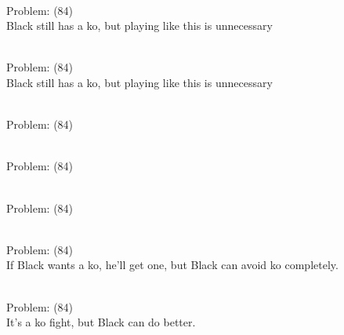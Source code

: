 \documentclass[11pt]{article}
\begin{document}
\begin{minipage}[t]{0.5\textwidth}
  {\centering
  
\\
Problem: (84)\\
Black still has a ko, but playing like this is unnecessary\\
  }
\end{minipage}
\begin{minipage}[t]{0.5\textwidth}
  {\centering
  
\\
Problem: (84)\\
Black still has a ko, but playing like this is unnecessary\\
  }
\end{minipage}
\begin{minipage}[t]{0.5\textwidth}
  {\centering
  
\\
Problem: (84)\\
  }
\end{minipage}
\begin{minipage}[t]{0.5\textwidth}
  {\centering
  
\\
Problem: (84)\\
  }
\end{minipage}
\begin{minipage}[t]{0.5\textwidth}
  {\centering
  
\\
Problem: (84)\\
  }
\end{minipage}
\begin{minipage}[t]{0.5\textwidth}
  {\centering
  
\\
Problem: (84)\\
If Black wants a ko, he'll get one, but Black can avoid ko completely.\\
  }
\end{minipage}
\begin{minipage}[t]{0.5\textwidth}
  {\centering
  
\\
Problem: (84)\\
It's a ko fight, but Black can do better.\\
  }
\end{minipage}
\end{document}
